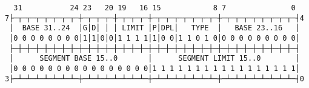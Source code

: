 \documentclass[varwidth=50em]{standalone}
\begin{document}
\begin{verbatim}
  31           24 23   20 19   16 15            8 7               0
7├─┬─┬─┬─┬─┬─┬─┬─┼─┬─┬─┬─┼─┬─┬─┬─┼─┬─┬─┬─┬─┬─┬─┬─┼─┬─┬─┬─┬─┬─┬─┬─┬─┤4
 │  BASE 31..24  │G│D│ │ │ LIMIT │P│DPL│   TYPE  │   BASE 23..16   │ 
 │0 0 0 0 0 0 0 0│1│1│0│0│1 1 1 1│1│0 0│1 1 0 1 0│0 0 0 0 0 0 0 0 0│
 ├─┼─┼─┼─┼─┼─┼─┼─┼─┼─┼─┼─┼─┼─┼─┼─┼─┼─┼─┼─┼─┼─┼─┼─┼─┼─┼─┼─┼─┼─┼─┼─┼─┤
 │      SEGMENT BASE 15..0       │      SEGMENT LIMIT 15..0        │ 
 │0 0 0 0 0 0 0 0 0 0 0 0 0 0 0 0│1 1 1 1 1 1 1 1 1 1 1 1 1 1 1 1 1│
3├─┴─┴─┴─┴─┴─┴─┴─┼─┴─┴─┴─┴─┴─┴─┴─┼─┴─┴─┴─┴─┴─┴─┴─┼─┴─┴─┴─┴─┴─┴─┴─┴─┤0
\end{verbatim}
\end{document}
